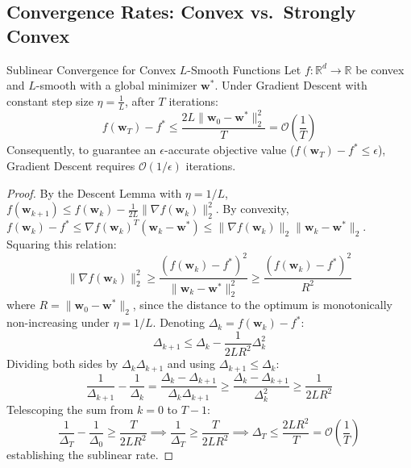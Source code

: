 \subsection{Convergence Rates: Convex vs.\ Strongly Convex}

\begin{theorembox}{Sublinear Convergence for Convex $L$-Smooth Functions}
\label{thm:convex_rate}
Let $f: \mathbb{R}^d \to \mathbb{R}$ be convex and $L$-smooth with a global minimizer $\mathbf{w}^*$. Under Gradient Descent with constant step size $\eta = \frac{1}{L}$, after $T$ iterations:
\begin{equation}
f(\mathbf{w}_T) - f^* \le \frac{2L \|\mathbf{w}_0 - \mathbf{w}^*\|_2^2}{T} = \mathcal{O}\left(\frac{1}{T}\right)
\label{eq:convex_rate}
\end{equation}
Consequently, to guarantee an $\epsilon$-accurate objective value ($f(\mathbf{w}_T) - f^* \le \epsilon$), Gradient Descent requires $\mathcal{O}(1/\epsilon)$ iterations.
\end{theorembox}

\begin{proof}
By the Descent Lemma with $\eta = 1/L$, $f(\mathbf{w}_{k+1}) \le f(\mathbf{w}_k) - \frac{1}{2L}\|\nabla f(\mathbf{w}_k)\|_2^2$.
By convexity, $f(\mathbf{w}_k) - f^* \le \nabla f(\mathbf{w}_k)^T (\mathbf{w}_k - \mathbf{w}^*) \le \|\nabla f(\mathbf{w}_k)\|_2 \|\mathbf{w}_k - \mathbf{w}^*\|_2$.
Squaring this relation:
\begin{equation}
\|\nabla f(\mathbf{w}_k)\|_2^2 \ge \frac{(f(\mathbf{w}_k) - f^*)^2}{\|\mathbf{w}_k - \mathbf{w}^*\|_2^2} \ge \frac{(f(\mathbf{w}_k) - f^*)^2}{R^2}
\end{equation}
where $R = \|\mathbf{w}_0 - \mathbf{w}^*\|_2$, since the distance to the optimum is monotonically non-increasing under $\eta = 1/L$.
Denoting $\Delta_k = f(\mathbf{w}_k) - f^*$:
\begin{equation}
\Delta_{k+1} \le \Delta_k - \frac{1}{2L R^2} \Delta_k^2
\end{equation}
Dividing both sides by $\Delta_k \Delta_{k+1}$ and using $\Delta_{k+1} \le \Delta_k$:
\begin{equation}
\frac{1}{\Delta_{k+1}} - \frac{1}{\Delta_k} = \frac{\Delta_k - \Delta_{k+1}}{\Delta_k \Delta_{k+1}} \ge \frac{\Delta_k - \Delta_{k+1}}{\Delta_k^2} \ge \frac{1}{2L R^2}
\end{equation}
Telescoping the sum from $k = 0$ to $T - 1$:
\begin{equation}
\frac{1}{\Delta_T} - \frac{1}{\Delta_0} \ge \frac{T}{2L R^2} \implies \frac{1}{\Delta_T} \ge \frac{T}{2L R^2} \implies \Delta_T \le \frac{2L R^2}{T} = \mathcal{O}\left(\frac{1}{T}\right)
\end{equation}
establishing the sublinear rate.
\end{proof}

